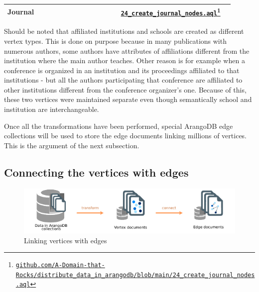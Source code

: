 \begin{center}
\begin{longtable}{p{0.47\linewidth}p{0.47\linewidth}}
		\hline
		Journal & \href{https://github.com/A-Domain-that-Rocks/distribute_data_in_arangodb/blob/main/24_create_journal_nodes.aql}{\texttt{24\_create\_journal\_nodes.aql}}\footnote{\href{https://github.com/A-Domain-that-Rocks/distribute\_data\_in\_arangodb/blob/main/24\_create\_journal\_nodes.aql}{\texttt{github.com/A-Domain-that-Rocks/distribute\_data\_in\_arangodb/blob/main/24\_create\_journal\_nodes.aql}}}\\
		\hline
	\end{longtable}
	\vspace*{-1.35cm}
\end{center}

\begin{remark}\label{remark:onaffiliatedinstitutionsandschools}
    Should be noted that affiliated institutions and schools are created as different vertex types.
    This is done on purpose because in many publications with numerous authors, some authors have attributes of affiliations different from the institution where the main author teaches.
    Other reason is for example when a conference is organized in an institution and its proceedings affiliated to that institutions - but all the authors participating that conference are affiliated to other institutions different from the conference organizer's one.
    Because of this, these two vertices were maintained separate even though semantically school and institution are interchangeable.
\end{remark}

Once all the transformations have been performed, special ArangoDB edge collections will be used to store the edge documents linking millions of vertices.
This is the argument of the next subsection.

\subsection{Connecting the vertices with edges} \label{subsection:ImplementingtheWebApp/Thedata/Connectingtheverticeswithedges}
\begin{figure}[H]%
	\centering%
	\includegraphics[width=1\textwidth,%
	]{images/chapter4/datatransformationstransformconnect.pdf}%
	\caption[Linking vertices with edges]{Linking vertices with edges}%
	\label{fig:datatransformationstransformconnect}%
\end{figure}%

